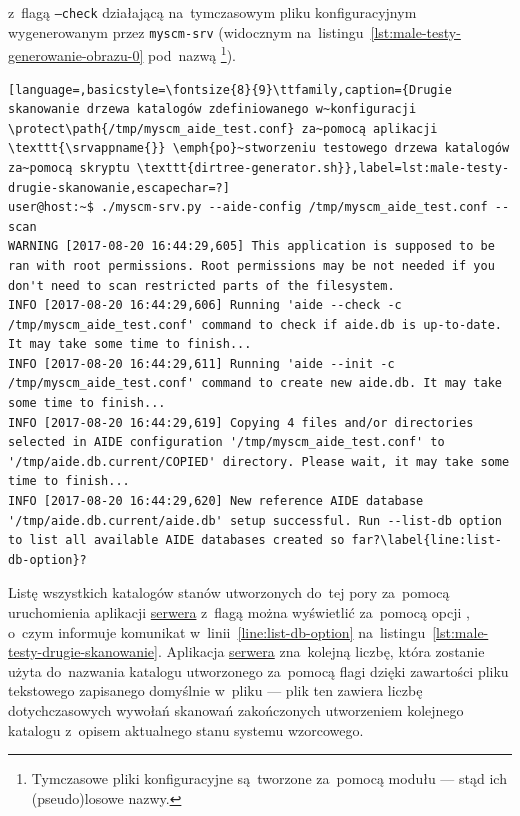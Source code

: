 \documentclass[thesis]{subfiles}
\begin{document}
z~flagą \texttt{--check} działającą na~tymczasowym pliku konfiguracyjnym wygenerowanym przez \texttt{myscm-srv} (widocznym na~listingu~\ref{lst:male-testy-generowanie-obrazu-0} pod~nazwą \footnote{Tymczasowe pliki konfiguracyjne są~tworzone za~pomocą modułu \python{}  --- stąd ich (pseudo)losowe nazwy.}).

\begin{lstlisting}[language=,basicstyle=\fontsize{8}{9}\ttfamily,caption={Drugie skanowanie drzewa katalogów zdefiniowanego w~konfiguracji \protect\path{/tmp/myscm_aide_test.conf} za~pomocą aplikacji \texttt{\srvappname{}} \emph{po}~stworzeniu testowego drzewa katalogów za~pomocą skryptu \texttt{dirtree-generator.sh}},label=lst:male-testy-drugie-skanowanie,escapechar=?]
user@host:~$ ./myscm-srv.py --aide-config /tmp/myscm_aide_test.conf --scan
WARNING [2017-08-20 16:44:29,605] This application is supposed to be ran with root permissions. Root permissions may be not needed if you don't need to scan restricted parts of the filesystem.
INFO [2017-08-20 16:44:29,606] Running 'aide --check -c /tmp/myscm_aide_test.conf' command to check if aide.db is up-to-date. It may take some time to finish...
INFO [2017-08-20 16:44:29,611] Running 'aide --init -c /tmp/myscm_aide_test.conf' command to create new aide.db. It may take some time to finish...
INFO [2017-08-20 16:44:29,619] Copying 4 files and/or directories selected in AIDE configuration '/tmp/myscm_aide_test.conf' to '/tmp/aide.db.current/COPIED' directory. Please wait, it may take some time to finish...
INFO [2017-08-20 16:44:29,620] New reference AIDE database '/tmp/aide.db.current/aide.db' setup successful. Run --list-db option to list all available AIDE databases created so far?\label{line:list-db-option}?
\end{lstlisting}

Listę wszystkich katalogów stanów utworzonych do~tej pory za~pomocą uruchomienia aplikacji \hyperref[sec:srv-app]{serwera} z~flagą  można wyświetlić za~pomocą opcji , o~czym informuje komunikat w~linii~\ref{line:list-db-option} na~listingu~\ref{lst:male-testy-drugie-skanowanie}. Aplikacja \hyperref[sec:srv-app]{serwera} zna~kolejną liczbę, która zostanie użyta do~nazwania katalogu utworzonego za~pomocą flagi  dzięki zawartości pliku tekstowego zapisanego domyślnie w~pliku  --- plik ten zawiera liczbę dotychczasowych wywołań skanowań zakończonych utworzeniem kolejnego katalogu z~opisem aktualnego stanu systemu wzorcowego.
\end{document}
